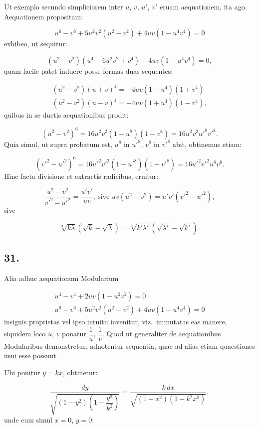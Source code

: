 \documentclass{article}
\begin{document}
Ut exemplo secundo simpliciorem inter $u$, $v$, $u'$, $v'$ eruam aequationem, ita ago. Aequationem propositam:

\[
u^{6}-v^{6}+5u^{2}v^{2}(u^{2}-v^{2})+4uv(1-u^{4}v^{4})=0
\]
exhibeo, ut sequitur:

\[
(u^{2}-v^{2})(u^{4}+6u^{2}v^{2}+v^{4})+4uv(1-u^{4}v^{4})=0,
\]
quam facile patet induere posse formas duas sequentes:

\[
\begin{gathered}
(u^{2}-v^{2})(u+v)^{4}=-4uv(1-u^{4})(1+v^{4})\\
(u^{2}-v^{2})(u-v)^{4}=-4uv(1+u^{4})(1-v^{4}),
\end{gathered}
\]
quibus in se ductis aequationibus prodit:

\[
(u^{2}-v^{2})^{6}=16u^{2}v^{2}(1-u^{8})(1-v^{8})=16u^{2}v^{2}u'^{8}v'^{8}.
\]
Quia simul, ut supra probatum est, $u^{8}$ in $u'^{8}$, $v^{8}$ in $v'^{8}$ abit, obtinemus etiam:

\[
(v'^{2}-u'^{2})^{6}=16u'^{2}v'^{2}(1-u'^{8})(1-v'^{8})=16u'^{2}v'^{2}u^{8}v^{8}.
\]
Hinc facta divisione et extractis radicibus, eruitur:

\[
\frac{u^{2}-v^{2}}{v'^{2}-u'^{2}}=\frac{u'v'}{uv},\ \text{sive }uv(u^{2}-v^{2})=u'v'(v'^{2}-u'^{2}),
\]
sive

\[
\sqrt[4]{k\lambda}\left(\sqrt{k}-\sqrt{\lambda}\right)=\sqrt[4]{k'\lambda'}\left(\sqrt{\lambda'}-\sqrt{k'}\right).
\]

\subsection*{31.}

Alia adhuc aequationum Modularium

\[
\begin{gathered}
u^{4}-v^{4}+2uv(1-u^{2}v^{2})=0\\
u^{6}-v^{6}+5u^{2}v^{2}(u^{2}-v^{2})+4uv(1-u^{4}v^{4})=0
\end{gathered}
\]
insignis proprietas vel ipso intuitu invenitur, viz.\ immutatas eas manere, siquidem loco $u$, $v$ ponatur $\dfrac{1}{u}$, $\dfrac{1}{v}$. Quod ut generaliter de aequationibus Modularibus demonstretur, adnotentur sequentia, quae ad alias etiam quaestiones usui esse possunt.

Ubi ponitur $y=kx$, obtinetur:

\[
\frac{dy}{\sqrt{(1-y^{2})\left(1-\dfrac{y^{2}}{k^{2}}\right)}}=\frac{k\,dx}{\sqrt{(1-x^{2})(1-k^{2}x^{2})}},
\]
unde cum simul $x=0$, $y=0$:
\end{document}
